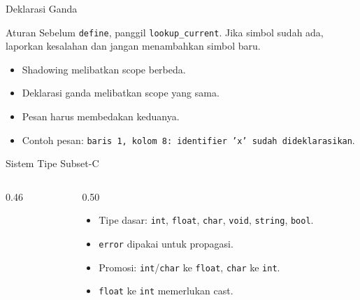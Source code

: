 \documentclass[aspectratio=169,10pt,t]{beamer}
\begin{document}
\begin{frame}{Deklarasi Ganda}
  \begin{block}{Aturan}
    \small
    Sebelum \texttt{define}, panggil \texttt{lookup\_current}. Jika
    simbol sudah ada, laporkan kesalahan dan jangan menambahkan simbol
    baru.
  \end{block}

  \begin{itemize}
    \item Shadowing melibatkan scope berbeda.
    \item Deklarasi ganda melibatkan scope yang sama.
    \item Pesan harus membedakan keduanya.
    \item Contoh pesan:
          \texttt{baris 1, kolom 8: identifier 'x' sudah
          dideklarasikan}.
  \end{itemize}
\end{frame}

\begin{frame}{Sistem Tipe Subset-C}
  \begin{columns}[T,onlytextwidth]
    \begin{column}{0.46\textwidth}
      \centering
    \end{column}
    \begin{column}{0.50\textwidth}
      \begin{itemize}
        \item Tipe dasar: \texttt{int}, \texttt{float},
              \texttt{char}, \texttt{void}, \texttt{string},
              \texttt{bool}.
        \item \texttt{error} dipakai untuk propagasi.
        \item Promosi: \texttt{int}/\texttt{char} ke \texttt{float},
              \texttt{char} ke \texttt{int}.
        \item \texttt{float} ke \texttt{int} memerlukan cast.
      \end{itemize}
    \end{column}
  \end{columns}
\end{frame}
\end{document}
